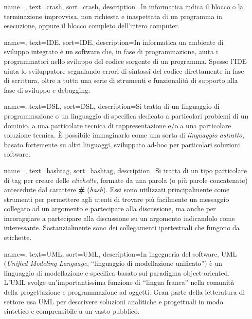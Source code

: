 {
    name=,
    text=crash,
    sort=crash,
    description={In informatica indica il blocco o la terminazione improvvisa, non richiesta e inaspettata di un programma in esecuzione, oppure il blocco completo dell'intero computer.}
}

{
    name=,
    text=IDE,
    sort=IDE,
    description={In informatica un ambiente di sviluppo integrato è un software che, in fase di programmazione, aiuta i programmatori nello sviluppo del codice sorgente di un programma. Spesso l'IDE aiuta lo sviluppatore segnalando errori di sintassi del codice direttamente in fase di scrittura, oltre a tutta una serie di strumenti e funzionalità di supporto alla fase di sviluppo e debugging.}
}

{
    name=,
    text=DSL,
    sort=DSL,
    description={Si tratta di un linguaggio di programmazione o un linguaggio di specifica dedicato a particolari problemi di un dominio, a una particolare tecnica di rappresentazione e/o a una particolare soluzione tecnica. È possibile immaginarlo come una sorta di \textit{linguaggio astratto}, basato fortemente su altri linguaggi, sviluppato ad-hoc per particolari soluzioni software.}
}

{
    name=,
    text=hashtag,
    sort=hashtag,
    description={Si tratta di un tipo particolare di tag per creare delle \textit{etichette}, formate da una parola (o più parole concatenate) antecedute dal carattere \textbf{\#} (\textit{hash}). Essi sono utilizzati principalmente come strumenti per permettere agli utenti di trovare più facilmente un messaggio collegato ad un argomento e partecipare alla discussione, ma anche per incoraggiare a partecipare alla discussione su un argomento indicandolo come interessante. Sostanzialmente sono dei collegamenti ipertestuali che fungono da etichette.}
}

{
    name=,
    text=UML,
    sort=UML,
    description={In ingegneria del software, UML (\textit{Unified Modeling Language}, ``linguaggio di modellazione unificato'') è un linguaggio di modellazione e specifica basato sul paradigma object-oriented. L'UML svolge un'importantissima funzione di ``lingua franca'' nella comunità della progettazione e programmazione ad oggetti. Gran parte della letteratura di settore usa UML per descrivere soluzioni analitiche e progettuali in modo sintetico e comprensibile a un vasto pubblico.}
}

